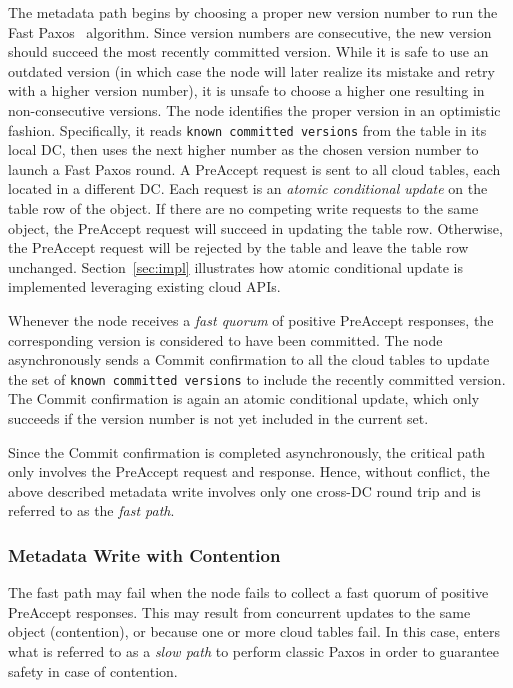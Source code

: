 The metadata path begins by choosing a proper new version number to run the Fast
Paxos~\cite{lamport05fast} algorithm. Since version numbers are consecutive, the
new version should succeed the most recently committed version. While it is safe
to use an outdated version (in which case the {\name} node will later realize
its mistake and retry with a higher version number), it is unsafe to choose a
higher one resulting in non-consecutive versions. The {\name} node identifies
the proper version in an optimistic fashion. Specifically, it reads {\tt known
  committed versions} from the table in its local DC, then uses the next higher
number as the chosen version number to launch a Fast Paxos round. A PreAccept
request is sent to all cloud tables, each located in a different DC. Each
request is an {\em atomic conditional update} on the table row of the object. If
there are no competing write requests to the same object, the PreAccept request
will succeed in updating the table row. Otherwise, the PreAccept request will be
rejected by the table and leave the table row unchanged. Section~\ref{sec:impl}
illustrates how atomic conditional update is implemented leveraging existing
cloud APIs.

Whenever the {\name} node receives a {\em fast quorum} of positive PreAccept
responses, the corresponding version is considered to have been committed. The
{\name} node asynchronously sends a Commit confirmation to all the cloud tables
to update the set of {\tt known committed versions} to include the recently
committed version. The Commit confirmation is again an atomic conditional
update, which only succeeds if the version number is not yet included in the
current set.

Since the Commit confirmation is completed asynchronously, the critical path
only involves the PreAccept request and response. Hence, without conflict, the
above described metadata write involves only one cross-DC round trip and is
referred to as the {\em fast path}.

\subsubsection{Metadata Write with Contention}

The fast path may fail when the {\name} node fails to collect a fast quorum of
positive PreAccept responses. This may result from concurrent updates to the
same object (contention), or because one or more cloud tables fail. In this
case, {\name} enters what is referred to as a \emph{slow path} to perform
classic Paxos in order to guarantee safety in case of contention.


